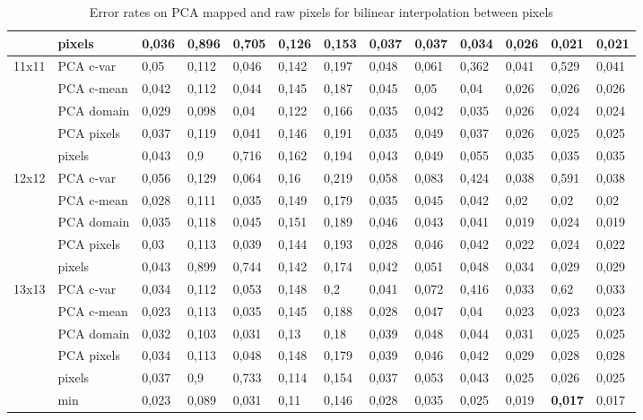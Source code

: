 \documentclass{article}
\begin{document}
\begin{table}[H]
\begin{tabular}{l|l|llllllllll|l|}
          & pixels & 0,036 & 0,896 & 0,705 & 0,126 & 0,153 & 0,037 & 0,037 & 0,034 & 0,026 & 0,021 & 0,021 \\ \hline
    11x11 & PCA c-var & 0,05  & 0,112 & 0,046 & 0,142 & 0,197 & 0,048 & 0,061 & 0,362 & 0,041 & 0,529 & 0,041 \\
          & PCA c-mean & 0,042 & 0,112 & 0,044 & 0,145 & 0,187 & 0,045 & 0,05  & 0,04  & 0,026 & 0,026 & 0,026 \\
          & PCA domain & 0,029 & 0,098 & 0,04  & 0,122 & 0,166 & 0,035 & 0,042 & 0,035 & 0,026 & 0,024 & 0,024 \\
          & PCA pixels & 0,037 & 0,119 & 0,041 & 0,146 & 0,191 & 0,035 & 0,049 & 0,037 & 0,026 & 0,025 & 0,025 \\
          & pixels & 0,043 & 0,9   & 0,716 & 0,162 & 0,194 & 0,043 & 0,049 & 0,055 & 0,035 & 0,035 & 0,035 \\ \hline
    12x12 & PCA c-var & 0,056 & 0,129 & 0,064 & 0,16  & 0,219 & 0,058 & 0,083 & 0,424 & 0,038 & 0,591 & 0,038 \\
          & PCA c-mean & 0,028 & 0,111 & 0,035 & 0,149 & 0,179 & 0,035 & 0,045 & 0,042 & 0,02  & 0,02  & 0,02 \\
          & PCA domain & 0,035 & 0,118 & 0,045 & 0,151 & 0,189 & 0,046 & 0,043 & 0,041 & 0,019 & 0,024 & 0,019 \\
          & PCA pixels & 0,03  & 0,113 & 0,039 & 0,144 & 0,193 & 0,028 & 0,046 & 0,042 & 0,022 & 0,024 & 0,022 \\
          & pixels & 0,043 & 0,899 & 0,744 & 0,142 & 0,174 & 0,042 & 0,051 & 0,048 & 0,034 & 0,029 & 0,029 \\ \hline
    13x13 & PCA c-var & 0,034 & 0,112 & 0,053 & 0,148 & 0,2   & 0,041 & 0,072 & 0,416 & 0,033 & 0,62  & 0,033 \\
          & PCA c-mean & 0,023 & 0,113 & 0,035 & 0,145 & 0,188 & 0,028 & 0,047 & 0,04  & 0,023 & 0,023 & 0,023 \\
          & PCA domain & 0,032 & 0,103 & 0,031 & 0,13  & 0,18  & 0,039 & 0,048 & 0,044 & 0,031 & 0,025 & 0,025 \\
          & PCA pixels & 0,034 & 0,113 & 0,048 & 0,148 & 0,179 & 0,039 & 0,046 & 0,042 & 0,029 & 0,028 & 0,028 \\
          & pixels & 0,037 & 0,9   & 0,733 & 0,114 & 0,154 & 0,037 & 0,053 & 0,043 & 0,025 & 0,026 & 0,025 \\ \hline
          & min   & 0,023 & 0,089 & 0,031 & 0,11  & 0,146 & 0,028 & 0,035 & 0,025 & 0,019 & \textbf{0,017} & 0,017 \\
    \hline
    \end{tabular}%
		  \caption{Error rates on PCA mapped and raw pixels for bilinear interpolation between pixels}   \label{table: errorrates of PCA mappings bilinear}%
\end{table}%
\end{document}
